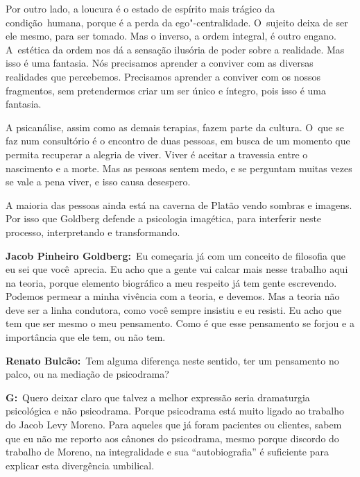 Por outro lado, a loucura é o estado de espírito mais trágico da
condição\textbf{}~humana, porque é a perda da ego"-centralidade. O~sujeito deixa de ser ele mesmo, para ser tomado. Mas o inverso, a
ordem integral, é outro engano. A~estética da ordem nos dá a sensação
ilusória de poder sobre a realidade. Mas isso é uma fantasia. Nós
precisamos aprender a conviver com as diversas realidades que
percebemos. Precisamos aprender a conviver com os nossos fragmentos, sem
pretendermos criar um ser único e íntegro, pois isso é uma fantasia.

A psicanálise, assim como as demais terapias, fazem parte da cultura. O~que se faz num consultório é o encontro de duas pessoas, em busca de um
momento que permita recuperar a alegria de viver. Viver é aceitar a
travessia entre o nascimento e a morte. Mas as pessoas sentem medo, e se
perguntam muitas vezes se vale a pena viver, e isso causa desespero.

A maioria das pessoas ainda está na caverna de Platão vendo sombras e
imagens. Por isso que Goldberg defende a psicologia imagética, para
interferir neste processo, interpretando e transformando.

\begin{center}\asterisc{}\end{center}

\abrefala

\textbf{Jacob Pinheiro Goldberg:}~Eu começaria já com um conceito de
filosofia que eu sei que você\textbf{}~aprecia. Eu acho que a gente vai
calcar mais nesse trabalho aqui na teoria, porque elemento biográfico a
meu respeito já tem gente escrevendo. Podemos permear a minha vivência
com a teoria, e devemos. Mas a teoria não deve ser a linha condutora,
como você sempre insistiu e eu resisti. Eu acho que tem que ser mesmo o
meu pensamento. Como é que esse pensamento se forjou e a importância que
ele tem, ou não tem.

 

\textbf{Renato Bulcão:}~Tem alguma diferença neste sentido, ter um
pensamento no palco, ou na mediação de psicodrama?

 

\textbf{G:}~Quero deixar claro que talvez a melhor expressão seria
dramaturgia psicológica e não psicodrama. Porque psicodrama está muito
ligado ao trabalho do Jacob Levy Moreno. Para aqueles que já foram
pacientes ou clientes, sabem que eu não me reporto aos cânones do
psicodrama, mesmo porque discordo do trabalho de Moreno, na
integralidade e sua ``autobiografia'' é suficiente para explicar esta
divergência umbilical.

